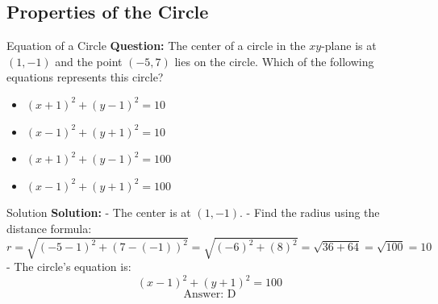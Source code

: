 \documentclass{beamer}
\begin{document}
\begin{frame}
\section{Properties of the Circle}
\end{frame}


\begin{frame}{Equation of a Circle}
\textbf{Question:}  
The center of a circle in the \(xy\)-plane is at \((1, -1)\) and the point \((-5, 7)\) lies on the circle. Which of the following equations represents this circle?
\begin{itemize}
    \item[A] \( (x + 1)^2 + (y - 1)^2 = 10 \)
    \item[B] \( (x - 1)^2 + (y + 1)^2 = 10 \)
    \item[C] \( (x + 1)^2 + (y - 1)^2 = 100 \)
    \item[D] \( (x - 1)^2 + (y + 1)^2 = 100 \)
\end{itemize}
\end{frame}

\begin{frame}{Solution}
\textbf{Solution:}  
- The center is at \((1, -1)\).
- Find the radius using the distance formula:
\[
r = \sqrt{(-5 - 1)^2 + (7 - (-1))^2} = \sqrt{(-6)^2 + (8)^2} = \sqrt{36 + 64} = \sqrt{100} = 10
\]
- The circle’s equation is:
\[
(x - 1)^2 + (y + 1)^2 = 100
\]
\[
\boxed{\text{Answer: D}}
\]
\end{frame}
\end{document}
